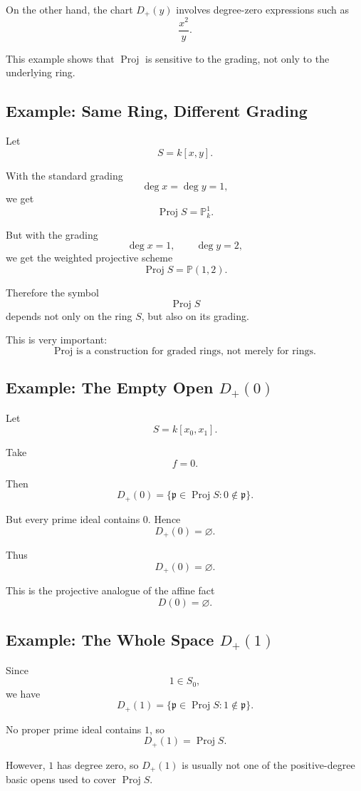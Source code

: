 \documentclass[12pt,a4paper]{article}
\DeclareMathOperator{\Proj}{Proj}
\newcommand{\PP}{\mathbb P}
\theoremstyle{notespace}
\begin{document}
On the other hand, the chart \(D_+(y)\) involves degree-zero expressions such as
\[
\frac{x^2}{y}.
\]

This example shows that \(\Proj\) is sensitive to the grading, not only to the underlying ring.

\subsection{Example: Same Ring, Different Grading}

Let
\[
S=k[x,y].
\]

With the standard grading
\[
\deg x=\deg y=1,
\]
we get
\[
\Proj S=\PP_k^1.
\]

But with the grading
\[
\deg x=1,
\qquad
\deg y=2,
\]
we get the weighted projective scheme
\[
\Proj S=\PP(1,2).
\]

Therefore the symbol
\[
\Proj S
\]
depends not only on the ring \(S\), but also on its grading.

This is very important:
\[
\boxed{
	\Proj \text{ is a construction for graded rings, not merely for rings.}
}
\]

\subsection{Example: The Empty Open \texorpdfstring{$D_+(0)$}{D+(0)}}

Let
\[
S=k[x_0,x_1].
\]

Take
\[
f=0.
\]

Then
\[
D_+(0)
=
\{\mathfrak p\in \Proj S:0\notin\mathfrak p\}.
\]

But every prime ideal contains \(0\). Hence
\[
D_+(0)=\varnothing.
\]

Thus
\[
\boxed{
	D_+(0)=\varnothing.
}
\]

This is the projective analogue of the affine fact
\[
D(0)=\varnothing.
\]

\subsection{Example: The Whole Space \texorpdfstring{$D_+(1)$}{D+(1)}}

Since
\[
1\in S_0,
\]
we have
\[
D_+(1)
=
\{\mathfrak p\in\Proj S:1\notin\mathfrak p\}.
\]

No proper prime ideal contains \(1\), so
\[
D_+(1)=\Proj S.
\]

However, \(1\) has degree zero, so \(D_+(1)\) is usually not one of the positive-degree basic opens used to cover \(\Proj S\).
\end{document}
